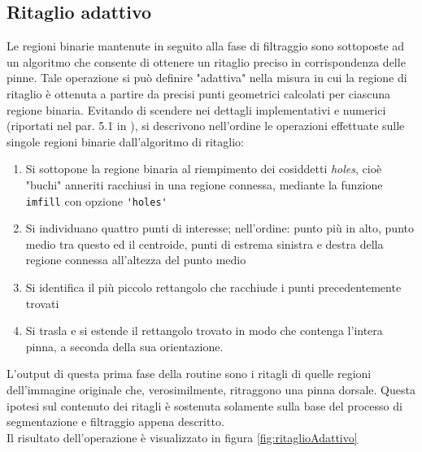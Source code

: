 \subsection*{Ritaglio adattivo}
Le regioni binarie mantenute in seguito alla fase di filtraggio sono sottoposte ad un algoritmo che consente di ottenere un ritaglio preciso in corrispondenza delle pinne.
Tale operazione si può definire "adattiva" nella misura in cui la regione di ritaglio è ottenuta a partire da precisi punti geometrici calcolati per ciascuna regione binaria.
Evitando di scendere nei dettagli implementativi e numerici (riportati nel par. 5.1 in \cite{gianvito}), si descrivono nell'ordine le operazioni effettuate sulle singole regioni binarie dall'algoritmo di ritaglio:
\begin{enumerate}
\item Si sottopone la regione binaria al riempimento dei cosiddetti \textit{holes}, cioè "buchi" anneriti racchiusi in una regione connessa, mediante la funzione \verb|imfill| con opzione \verb|'holes'|
\item Si individuano quattro punti di interesse; nell’ordine: punto più in alto, punto medio tra questo ed il centroide, punti di estrema sinistra e destra della regione connessa all’altezza del
punto medio
\item Si identifica il più piccolo rettangolo che racchiude i punti precedentemente trovati
\item Si trasla e si estende il rettangolo trovato in modo che contenga l’intera pinna, a seconda della sua orientazione.
\end{enumerate}

L'output di questa prima fase della routine sono i ritagli di quelle regioni dell'immagine originale che, verosimilmente, ritraggono una pinna dorsale. Questa ipotesi sul contenuto dei ritagli è sostenuta solamente sulla base del processo di segmentazione e filtraggio appena descritto.\\

\noindent Il risultato dell'operazione è visualizzato in figura \ref{fig:ritaglioAdattivo}\\

